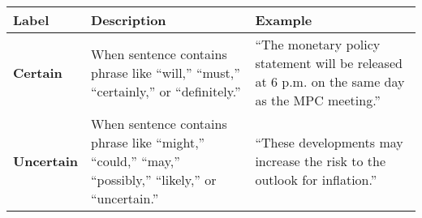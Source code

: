 \begin{table*}
    \caption{} \vspace{1em}
    \begin{tabular}{p{}p{}p{}}
    \toprule
    \textbf{Label} & \textbf{Description} & \textbf{Example} \\
    \midrule
    \textbf{Certain} & When sentence contains phrase like “will,” “must,” “certainly,” or “definitely.” & “The monetary policy statement will be released at 6 p.m. on the same day as the MPC meeting.” \\
    \midrule
    \textbf{Uncertain} & When sentence contains phrase like “might,” “could,” “may,” “possibly,” “likely,” or “uncertain.” & “These developments may increase the risk to the outlook for inflation.” \\
    \bottomrule
    \end{tabular}
    \label{tb:bok_certainty_guide}
\end{table*}